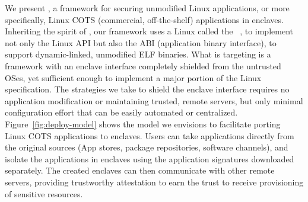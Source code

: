We present {\bf \graphenesgx{}}, a framework for securing unmodified Linux applications, or more specifically, Linux COTS (commercial, off-the-shelf) applications in enclaves.
Inheriting the spirit of \haven{}, our framework uses
a Linux \libos{} called the \graphene{} \libos{}~\cite{tsai14graphene},
to implement not only the Linux API but also the ABI (application binary interface), 
to support dynamic-linked, unmodified ELF binaries.
What \graphenesgx{} is targeting is a framework with an enclave interface completely shielded from the untrusted OSes,
yet sufficient enough to implement a major portion of the Linux specification.
The strategies we take to shield the enclave interface requires no application modification or maintaining trusted, remote servers,
but only minimal configuration effort that can be easily automated or centralized.
Figure~\ref{fig:deploy-model} shows the model we envisions to facilitate porting Linux COTS applications to enclaves.
Users can take applications directly from the original sources (App stores, package repositories, software channels),
and isolate the applications in enclaves using the application signatures downloaded separately.
The created enclaves can then communicate with other remote servers,
providing trustworthy attestation to earn the trust to receive provisioning of sensitive resources.










